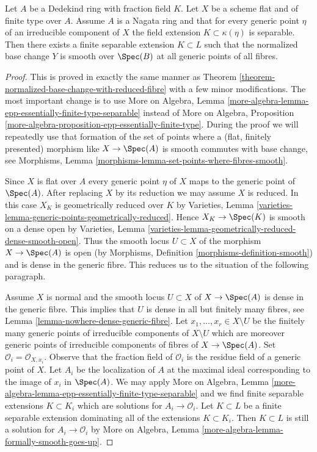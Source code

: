 \begin{lemma}
\label{lemma-normalized-base-change-with-reduced-fibre-separable}
Let $A$ be a Dedekind ring with fraction field $K$.
Let $X$ be a scheme flat and of finite type over $A$.
Assume $A$ is a Nagata ring and that for every generic point
$\eta$ of an irreducible component of $X$ the field
extension $K \subset \kappa(\eta)$ is separable.
Then there exists a finite separable extension $K \subset L$ such that
the normalized base change $Y$ is smooth over $\Spec(B)$
at all generic points of all fibres.
\end{lemma}

\begin{proof}
This is proved in exactly the same manner as
Theorem \ref{theorem-normalized-base-change-with-reduced-fibre}
with a few minor modifications. The most important change
is to use More on Algebra, Lemma
\ref{more-algebra-lemma-epp-essentially-finite-type-separable}
instead of More on Algebra, Proposition
\ref{more-algebra-proposition-epp-essentially-finite-type}.
During the proof we will repeatedly use that formation of the set of points
where a (flat, finitely presented) morphism like $X \to \Spec(A)$ is
smooth commutes with base change, see
Morphisms, Lemma \ref{morphisms-lemma-set-points-where-fibres-smooth}.

\medskip\noindent
Since $X$ is flat over $A$ every generic point $\eta$ of $X$ maps to the
generic point of $\Spec(A)$.
After replacing $X$ by its reduction we may assume $X$ is reduced.
In this case $X_K$ is geometrically reduced over $K$
by Varieties, Lemma \ref{varieties-lemma-generic-points-geometrically-reduced}.
Hence $X_K \to \Spec(K)$ is smooth on a dense open by
Varieties, Lemma \ref{varieties-lemma-geometrically-reduced-dense-smooth-open}.
Thus the smooth locus $U \subset X$ of the morphism $X \to \Spec(A)$
is open (by Morphisms, Definition \ref{morphisms-definition-smooth})
and is dense in the generic fibre. This reduces us to the situation
of the following paragraph.

\medskip\noindent
Assume $X$ is normal and the smooth locus $U \subset X$ of $X \to \Spec(A)$
is dense in the generic fibre. This implies that $U$ is dense in all but
finitely many fibres, see Lemma \ref{lemma-nowhere-dense-generic-fibre}.
Let $x_1, \ldots, x_r \in X \setminus U$ be the finitely many generic
points of irreducible components of $X \setminus U$ which are moreover
generic points of irreducible components of fibres of $X \to \Spec(A)$.
Set $\mathcal{O}_i = \mathcal{O}_{X, x_i}$. Observe that the fraction
field of $\mathcal{O}_i$ is the residue field of a generic point of $X$.
Let $A_i$ be the localization of $A$ at the maximal ideal corresponding
to the image of $x_i$ in $\Spec(A)$. We may apply More on Algebra, Lemma
\ref{more-algebra-lemma-epp-essentially-finite-type-separable}
and we find finite separable extensions $K \subset K_i$ which are
solutions for $A_i \to \mathcal{O}_i$. Let $K \subset L$ be a finite
separable extension dominating all of the extensions $K \subset K_i$.
Then $K \subset L$ is still a solution for $A_i \to \mathcal{O}_i$ by
More on Algebra, Lemma \ref{more-algebra-lemma-formally-smooth-goes-up}.


\end{proof}
